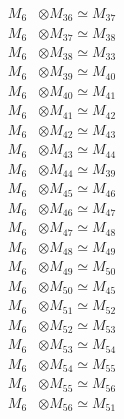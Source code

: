 \begin{align*}
M_{6} &\otimes M_{36} \simeq M_{37} \\
M_{6} &\otimes M_{37} \simeq M_{38} \\
M_{6} &\otimes M_{38} \simeq M_{33} \\
M_{6} &\otimes M_{39} \simeq M_{40} \\
M_{6} &\otimes M_{40} \simeq M_{41} \\
M_{6} &\otimes M_{41} \simeq M_{42} \\
M_{6} &\otimes M_{42} \simeq M_{43} \\
M_{6} &\otimes M_{43} \simeq M_{44} \\
M_{6} &\otimes M_{44} \simeq M_{39} \\
M_{6} &\otimes M_{45} \simeq M_{46} \\
M_{6} &\otimes M_{46} \simeq M_{47} \\
M_{6} &\otimes M_{47} \simeq M_{48} \\
M_{6} &\otimes M_{48} \simeq M_{49} \\
M_{6} &\otimes M_{49} \simeq M_{50} \\
M_{6} &\otimes M_{50} \simeq M_{45} \\
M_{6} &\otimes M_{51} \simeq M_{52} \\
M_{6} &\otimes M_{52} \simeq M_{53} \\
M_{6} &\otimes M_{53} \simeq M_{54} \\
M_{6} &\otimes M_{54} \simeq M_{55} \\
M_{6} &\otimes M_{55} \simeq M_{56} \\
M_{6} &\otimes M_{56} \simeq M_{51} \\
\end{align*}

